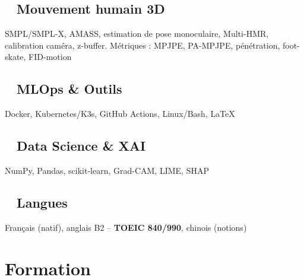 \documentclass{assets/template/cvclass}
\def\spaceSections{0.13cm}
\begin{document}
\begin{area-left}
    \vspace{\spaceSections}
    \subsection{\faRunning~ Mouvement humain 3D}
      SMPL/SMPL-X, AMASS, estimation de pose monoculaire, Multi-HMR, calibration caméra, z-buffer. Métriques : MPJPE, PA-MPJPE, pénétration, foot-skate, FID-motion

    \vspace{\spaceSections}
    \subsection{\faTools~ MLOps \& Outils}
      Docker, Kubernetes/K3s, GitHub Actions, Linux/Bash, \LaTeX{}

    \vspace{\spaceSections}
    \subsection{\faChartBar~ Data Science \& XAI}
      NumPy, Pandas, scikit-learn, Grad-CAM, LIME, SHAP


    \vspace{\spaceSections}
    \subsection{\faLanguage~ Langues}
      Français (natif), anglais B2 -- \textbf{TOEIC 840/990}, chinois (notions)

  \vspace{\spaceSections}
  \section{Formation}
  \vspace{\spaceSections}

\end{area-left}
\end{document}
